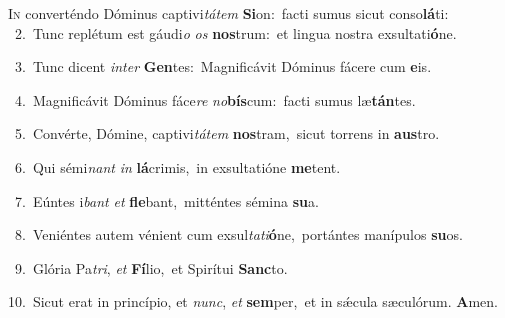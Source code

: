 \lettrine{\initial\textcolor{\initialcolor}{I}}{n} converténdo Dóminus captivi\-\textit{tá}\-\textit{tem} \textbf{Si}\-on:~\star facti sumus sicut conso\-\textbf{lá}\-ti:\\
{\numbfont\textcolor{\numbcolor}{~2.}}~Tunc replétum est gáudi\textit{o} \textit{os} \textbf{nos}\-trum:~\star et lingua nostra exsultati\-\textbf{ó}\-ne.\par
{\numbfont\textcolor{\numbcolor}{~3.}}~Tunc dicent \textit{in}\-\textit{ter} \textbf{Gen}\-tes:~\star Magnificávit Dóminus fácere cum \textbf{e}\-is.\par
{\numbfont\textcolor{\numbcolor}{~4.}}~Magnificávit Dóminus fáce\textit{re} \textit{no}\-\textbf{bís}cum:~\star facti sumus læ\-\textbf{tán}\-tes.\par
{\numbfont\textcolor{\numbcolor}{~5.}}~Convérte, Dómine, captivi\-\textit{tá}\-\textit{tem} \textbf{nos}\-tram,~\star sicut torrens in \textbf{aus}\-tro.\par
{\numbfont\textcolor{\numbcolor}{~6.}}~Qui sémi\textit{nant} \textit{in} \textbf{lá}\-crimis,~\star in exsultatióne \textbf{me}\-tent.\par
{\numbfont\textcolor{\numbcolor}{~7.}}~Eúntes i\textit{bant} \textit{et} \textbf{fle}\-bant,~\star mitténtes sémina \textbf{su}\-a.\par
{\numbfont\textcolor{\numbcolor}{~8.}}~Veniéntes autem vénient cum exsul\-\textit{ta}\-\textit{ti}\textbf{ó}ne,~\star portántes manípulos \textbf{su}\-os.\par
{\numbfont\textcolor{\numbcolor}{~9.}}~Glória Pa\-\textit{tri}\-, \textit{et} \textbf{Fí}\-lio,~\star et Spirítui \textbf{Sanc}\-to.\par
{\numbfont\textcolor{\numbcolor}{10.}}~Sicut erat in princípio, et \textit{nunc}\-, \textit{et} \textbf{sem}\-per,~\star et in sǽcula sæculórum. \textbf{A}\-men.\par
